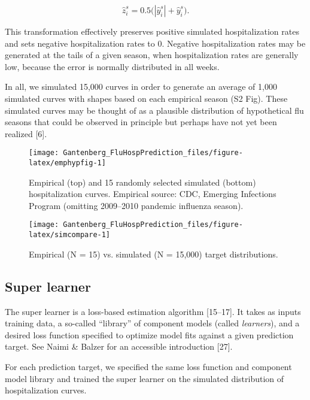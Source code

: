 \documentclass[10pt,letterpaper]{article}
\begin{document}
\[\hat{z}^s_i = 0.5 \bigg( | \hat{y}^s_i | + \hat{y}^s_i \bigg).\]

This transformation effectively preserves positive simulated
hospitalization rates and sets negative hospitalization rates to 0.
Negative hospitalization rates may be generated at the tails of a given
season, when hospitalization rates are generally low, because the error
is normally distributed in all weeks.

In all, we simulated 15,000 curves in order to generate an average of
1,000 simulated curves with shapes based on each empirical season (S2
Fig). These simulated curves may be thought of as a plausible
distribution of hypothetical flu seasons that could be observed in
principle but perhaps have not yet been realized {[}6{]}.

\begin{figure}
\texttt{[image: Gantenberg\_FluHospPrediction\_files/figure-latex/emphypfig-1]} \caption{Empirical (top) and 15 randomly selected simulated (bottom) hospitalization curves. Empirical source: CDC, Emerging Infections Program (omitting 2009--2010 pandemic influenza season).}\label{fig:emphypfig}
\end{figure}

\begin{figure}
\texttt{[image: Gantenberg\_FluHospPrediction\_files/figure-latex/simcompare-1]} \caption{Empirical (N = 15) vs. simulated (N = 15,000) target distributions.}\label{fig:simcompare}
\end{figure}

\hypertarget{super-learner}{%
\subsection{Super learner}\label{super-learner}}

The super learner is a loss-based estimation algorithm {[}15--17{]}. It
takes as inputs training data, a so-called ``library'' of component
models (called \emph{learners}), and a desired loss function specified
to optimize model fits against a given prediction target. See Naimi \&
Balzer for an accessible introduction {[}27{]}.

For each prediction target, we specified the same loss function and
component model library and trained the super learner on the simulated
distribution of hospitalization curves.
\end{document}
